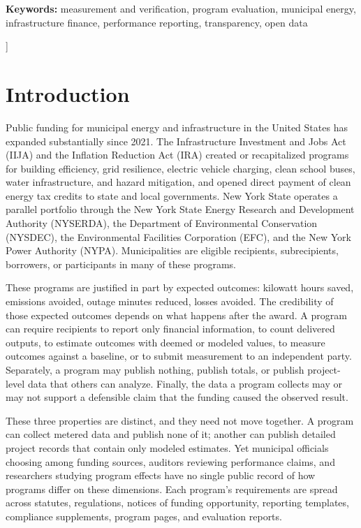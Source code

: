 \documentclass[10pt,twocolumn,letterpaper]{article}
\begin{document}
{\begin{center}
\begin{minipage}{0.86\textwidth}
\textbf{Keywords:} measurement and verification, program evaluation, municipal energy, infrastructure finance, performance reporting, transparency, open data
\end{minipage}
\end{center}
\vspace{10pt}
}]

\section{Introduction}

Public funding for municipal energy and infrastructure in the United States has expanded substantially since 2021. The Infrastructure Investment and Jobs Act (IIJA) \cite{iija2021} and the Inflation Reduction Act (IRA) \cite{ira2022} created or recapitalized programs for building efficiency, grid resilience, electric vehicle charging, clean school buses, water infrastructure, and hazard mitigation, and opened direct payment of clean energy tax credits to state and local governments. New York State operates a parallel portfolio through the New York State Energy Research and Development Authority (NYSERDA), the Department of Environmental Conservation (NYSDEC), the Environmental Facilities Corporation (EFC), and the New York Power Authority (NYPA). Municipalities are eligible recipients, subrecipients, borrowers, or participants in many of these programs.

These programs are justified in part by expected outcomes: kilowatt hours saved, emissions avoided, outage minutes reduced, losses avoided. The credibility of those expected outcomes depends on what happens after the award. A program can require recipients to report only financial information, to count delivered outputs, to estimate outcomes with deemed or modeled values, to measure outcomes against a baseline, or to submit measurement to an independent party. Separately, a program may publish nothing, publish totals, or publish project-level data that others can analyze. Finally, the data a program collects may or may not support a defensible claim that the funding caused the observed result.

These three properties are distinct, and they need not move together. A program can collect metered data and publish none of it; another can publish detailed project records that contain only modeled estimates. Yet municipal officials choosing among funding sources, auditors reviewing performance claims, and researchers studying program effects have no single public record of how programs differ on these dimensions. Each program's requirements are spread across statutes, regulations, notices of funding opportunity, reporting templates, compliance supplements, program pages, and evaluation reports.
\end{document}
